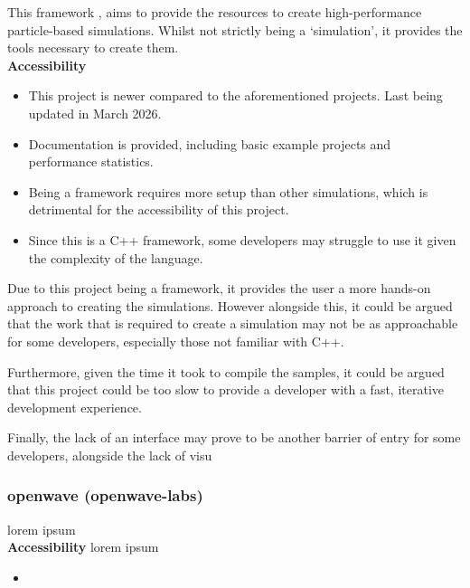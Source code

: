 This framework , aims to provide the resources to create high-performance particle-based simulations. Whilst not strictly being a `simulation', it provides the tools
necessary to create them.
\\
\textbf{Accessibility}

\begin{itemize}
    \item This project is newer compared to the aforementioned projects. Last being updated in March 2026.
    \item Documentation is provided, including basic example projects and performance statistics.
    \item Being a framework requires more setup than other simulations, which is detrimental for the accessibility of this project.
    \item Since this is a C++ framework, some developers may struggle to use it given the complexity of the language.
\end{itemize}

Due to this project being a framework, it provides the user a more hands-on approach to creating the simulations. However alongside this,
it could be argued that the work that is required to create a simulation may not be as approachable for some developers, especially those not familiar with C++.

Furthermore, given the time it took to compile the samples, it could be argued that this project could be too slow to provide a developer with a fast, iterative development experience.

Finally, the lack of an interface may prove to be another barrier of entry for some developers, alongside the lack of visu

\subsubsection*{openwave (openwave-labs)}
lorem ipsum
\\
\textbf{Accessibility}
lorem ipsum

\begin{itemize}
    \item 
\end{itemize}